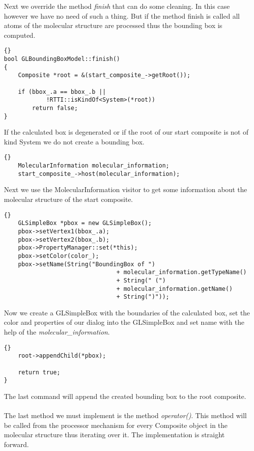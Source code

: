 Next we override the method {\em finish} that can do some cleaning. In this case
however we have no need of such a thing. But if the method finish is called
all atoms of the molecular structure are processed thus the bounding box is computed.

\begin{lstlisting}{}
bool GLBoundingBoxModel::finish()
{
	Composite *root = &(start_composite_->getRoot());

	if (bbox_.a == bbox_.b ||
			!RTTI::isKindOf<System>(*root))
		return false;
}
\end{lstlisting}

If the calculated box is degenerated or if the root of our start composite is
not of kind System we do not create a bounding box.

\begin{lstlisting}{}
	MolecularInformation molecular_information;
	start_composite_->host(molecular_information);                        
\end{lstlisting}

Next we use the MolecularInformation visitor to get some information about the
molecular structure of the start composite.

\begin{lstlisting}{}
	GLSimpleBox *pbox = new GLSimpleBox();
	pbox->setVertex1(bbox_.a);
	pbox->setVertex2(bbox_.b);
	pbox->PropertyManager::set(*this);
	pbox->setColor(color_);
	pbox->setName(String("BoundingBox of ")
								+ molecular_information.getTypeName()
								+ String(" (")
								+ molecular_information.getName()
								+ String(")"));
\end{lstlisting}

Now we create a GLSimpleBox with the boundaries of the calculated box, set the
color and properties of our dialog into the GLSimpleBox and set name with the help
of the {\em molecular\_information}.
																										 
\begin{lstlisting}{}
	root->appendChild(*pbox);

	return true;
}
\end{lstlisting}

The last command will append the created bounding box to the root composite.\\ \\

The last method we must implement is the method {\em operator()}. This method
will be called from the processor mechanism for every Composite object
in the molecular structure thus iterating over it.
The implementation is straight forward.


